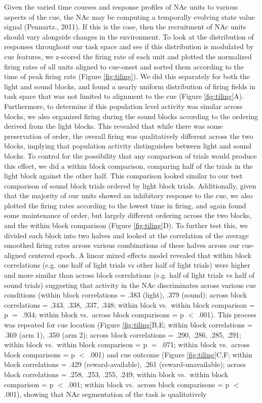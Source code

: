 \documentclass[11pt]{article}
\begin{document}
Given the varied time courses and response profiles of NAc units to various
aspects of the cue, the NAc may be computing a temporally evolving state value
signal (Pennartz., 2011). If this is the case, then the recruitment of NAc units
should vary alongside changes in the environment. To look at the distribution of
responses throughout our task space and see if this distribution is modulated by
cue features, we z-scored the firing rate of each unit and plotted the
normalized firing rates of all units aligned to cue-onset and sorted them
according to the time of peak firing rate (Figure \ref{fig:tiling}). We did this
separately for both the light and sound blocks, and found a nearly uniform
distribution of firing fields in task space that was not limited to alignment to
the cue (Figure \ref{fig:tiling}A). Furthermore, to determine if this population
level activity was similar across blocks, we also organized firing during the
sound blocks according to the ordering derived from the light blocks. This revealed that while there was some preservation of order, the overall firing was qualitatively different
across the two blocks, implying that population activity distinguishes between light and sound blocks. To control for the possibility that any comparison of
trials would produce this effect, we did a within block comparison, comparing
half of the trials in the light block against the other half. This comparison
looked similar to our test comparison of sound block trials ordered by light
block trials. Additionally, given that the majority of our units showed an
inhibitory response to the cue, we also plotted the firing rates according to
the lowest time in firing, and again found some maintenance of order, but
largely different ordering across the two blocks, and the within block
comparison (Figure \ref{fig:tiling}D). To further test this, we divided each
block into two halves and looked at the correlation of the average smoothed
firing rates across various combinations of these halves across our cue-aligned
centered epoch. A linear mixed effects model revealed that within block
correlations (e.g. one half of light trials vs other half of light trials) were
higher and more similar than across block correlations (e.g. half of light
trials vs half of sound trials) suggesting that activity in the NAc
discriminates across various cue conditions (within block correlations = .383 (light), .379 (sound); across block correlations = .343, .338, .337, .348; within block vs.\ within block comparison = p $=$ .934; within block vs.\ across block comparisons = p $<$ .001). This process was repeated for cue location (Figure \ref{fig:tiling}B,E; within block correlations = .369 (arm 1), .350 (arm 2); across block correlations = .290, .286, .285, .291; within block vs.\ within block comparison = p $=$ .071; within block vs.\ across block comparisons = p $<$ .001) and cue outcome (Figure \ref{fig:tiling}C,F;  within block correlations = .429 (reward-available), .261 (reward-unavailable); across block correlations = .258, .253, .255, .249; within block vs.\ within block comparison = p $<$ .001; within block vs.\ across block comparisons = p $<$ .001), showing that NAc segmentation of the task is qualitatively
\end{document}
